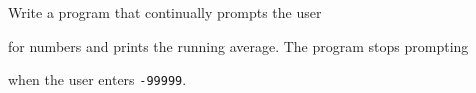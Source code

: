 Write a program that continually prompts the user

for numbers and prints the running average. The program stops prompting

when the user enters \texttt{-99999}.

